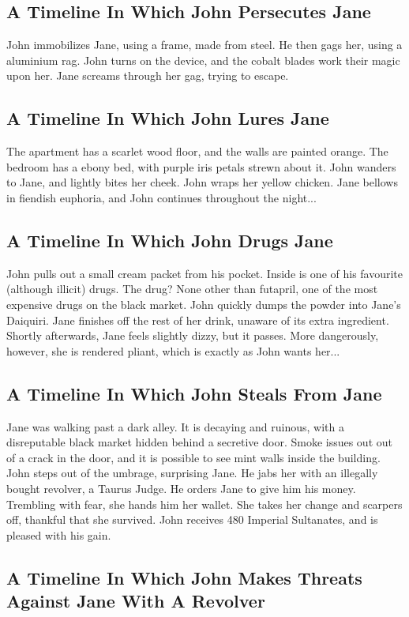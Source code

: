 \documentclass{article}
\begin{document}
\subsection{A Timeline In Which John Persecutes Jane}


John immobilizes Jane, using a frame, made from steel.
He then gags her, using a aluminium rag.
John turns on the device, and the cobalt blades work their magic upon her.
Jane screams through her gag, trying to escape.
\subsection{A Timeline In Which John Lures Jane}


The apartment has a scarlet wood floor, and the walls are painted orange.
The bedroom has a ebony bed, with purple iris petals strewn about it.
John wanders to Jane, and lightly bites her cheek.
John wraps her yellow chicken.
Jane bellows in fiendish euphoria, and John continues throughout the night...
\subsection{A Timeline In Which John Drugs Jane}


John pulls out a small cream packet from his pocket. Inside is one of his favourite (although illicit) drugs.
The drug? None other than futapril, one of the most expensive drugs on the black market.
John quickly dumps the powder into Jane's Daiquiri.
Jane finishes off the rest of her drink, unaware of its extra ingredient.
Shortly afterwards, Jane feels slightly dizzy, but it passes.
More dangerously, however, she is rendered pliant, which is exactly as John wants her...
\subsection{A Timeline In Which John Steals From Jane}


Jane was walking past a dark alley.
It is decaying and ruinous, with a disreputable black market hidden behind a secretive door.
Smoke issues out out of a crack in the door, and it is possible to see mint walls inside the building.
John steps out of the umbrage, surprising Jane.
He jabs her with an illegally bought revolver, a Taurus Judge.
He orders Jane to give him his money.
Trembling with fear, she hands him her wallet.
She takes her change and scarpers off, thankful that she survived.
John receives 480 Imperial Sultanates, and is pleased with his gain.
\subsection{A Timeline In Which John Makes Threats Against Jane With A Revolver}
\end{document}

